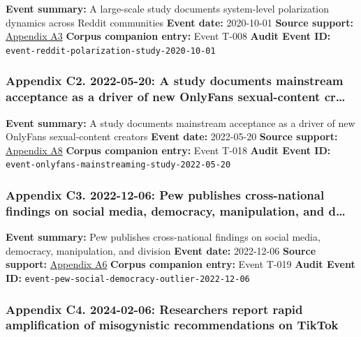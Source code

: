 \documentclass[
  american,
  11pt,
  letterpaper,
]{article}
\begin{document}
\textbf{Event summary:} A large-scale study documents system-level
polarization dynamics across Reddit communities \textbf{Event date:}
2020-10-01 \textbf{Source support:}
\hyperref[appendix-a3-quantifying-social-organization-and-political-polarization-in-online-platforms]{Appendix
A3} \textbf{Corpus companion entry:} Event T-008 \textbf{Audit Event
ID:} \texttt{event-reddit-polarization-study-2020-10-01}

\subsubsection{Appendix C2. 2022-05-20: A study documents mainstream
acceptance as a driver of new OnlyFans sexual-content
cr\ldots{}}\label{appendix-c2-2022-05-20-a-study-documents-mainstream-acceptance-as-a-driver-of-new-onlyfans-sexual-content-creators}

\textbf{Event summary:} A study documents mainstream acceptance as a
driver of new OnlyFans sexual-content creators \textbf{Event date:}
2022-05-20 \textbf{Source support:}
\hyperref[appendix-a8-nudes-shouldn-t-i-charge-for-these-motivations-of-new-sexual-content-creators-on-onlyfans]{Appendix
A8} \textbf{Corpus companion entry:} Event T-018 \textbf{Audit Event
ID:} \texttt{event-onlyfans-mainstreaming-study-2022-05-20}

\subsubsection{Appendix C3. 2022-12-06: Pew publishes cross-national
findings on social media, democracy, manipulation, and
d\ldots{}}\label{appendix-c3-2022-12-06-pew-publishes-cross-national-findings-on-social-media-democracy-manipulation-and-division}

\textbf{Event summary:} Pew publishes cross-national findings on social
media, democracy, manipulation, and division \textbf{Event date:}
2022-12-06 \textbf{Source support:}
\hyperref[appendix-a6-social-media-seen-as-mostly-good-for-democracy-across-many-nations-but-u-s-is-a-major-outlier]{Appendix
A6} \textbf{Corpus companion entry:} Event T-019 \textbf{Audit Event
ID:} \texttt{event-pew-social-democracy-outlier-2022-12-06}

\subsubsection{Appendix C4. 2024-02-06: Researchers report rapid
amplification of misogynistic recommendations on
TikTok}\label{appendix-c4-2024-02-06-researchers-report-rapid-amplification-of-misogynistic-recommendations-on-tiktok}
\end{document}
